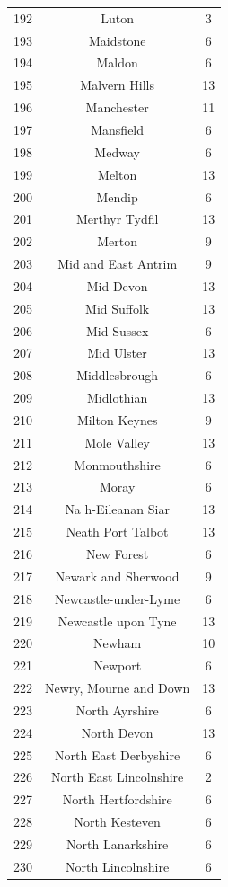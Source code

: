 \documentclass[Royal,times,sageh]{sagej}
\begin{document}
\begin{table}[!htbp]
\begin{tabular}{@{\extracolsep{5pt}} ccc}
192 & Luton & 3 \\ 
193 & Maidstone & 6 \\ 
194 & Maldon & 6 \\ 
195 & Malvern Hills & 13 \\ 
196 & Manchester & 11 \\ 
197 & Mansfield & 6 \\ 
198 & Medway & 6 \\ 
199 & Melton & 13 \\ 
200 & Mendip & 6 \\ 
201 & Merthyr Tydfil & 13 \\ 
202 & Merton & 9 \\ 
203 & Mid and East Antrim & 9 \\ 
204 & Mid Devon & 13 \\ 
205 & Mid Suffolk & 13 \\ 
206 & Mid Sussex & 6 \\ 
207 & Mid Ulster & 13 \\ 
208 & Middlesbrough & 6 \\ 
209 & Midlothian & 13 \\ 
210 & Milton Keynes & 9 \\ 
211 & Mole Valley & 13 \\ 
212 & Monmouthshire & 6 \\ 
213 & Moray & 6 \\ 
214 & Na h-Eileanan Siar & 13 \\ 
215 & Neath Port Talbot & 13 \\ 
216 & New Forest & 6 \\ 
217 & Newark and Sherwood & 9 \\ 
218 & Newcastle-under-Lyme & 6 \\ 
219 & Newcastle upon Tyne & 13 \\ 
220 & Newham & 10 \\ 
221 & Newport & 6 \\ 
222 & Newry, Mourne and Down & 13 \\ 
223 & North Ayrshire & 6 \\ 
224 & North Devon & 13 \\ 
225 & North East Derbyshire & 6 \\ 
226 & North East Lincolnshire & 2 \\ 
227 & North Hertfordshire & 6 \\ 
228 & North Kesteven & 6 \\ 
229 & North Lanarkshire & 6 \\ 
230 & North Lincolnshire & 6 \\ 

\end{tabular}
\end{table}
\end{document}
